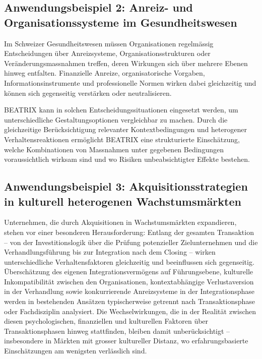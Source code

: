 \documentclass[11pt,a4paper]{article}
\begin{document}
\subsection{Anwendungsbeispiel 2: Anreiz- und Organisationssysteme im Gesundheitswesen}

Im Schweizer Gesundheitswesen müssen Organisationen regelmässig Entscheidungen über Anreizsysteme, Organisationsstrukturen oder Veränderungsmassnahmen treffen, deren Wirkungen sich über mehrere Ebenen hinweg entfalten. Finanzielle Anreize, organisatorische Vorgaben, Informationsinstrumente und professionelle Normen wirken dabei gleichzeitig und können sich gegenseitig verstärken oder neutralisieren.

BEATRIX kann in solchen Entscheidungssituationen eingesetzt werden, um unterschiedliche Gestaltungsoptionen vergleichbar zu machen. Durch die gleichzeitige Berücksichtigung relevanter Kontextbedingungen und heterogener Verhaltensreaktionen ermöglicht BEATRIX eine strukturierte Einschätzung, welche Kombinationen von Massnahmen unter gegebenen Bedingungen voraussichtlich wirksam sind und wo Risiken unbeabsichtigter Effekte bestehen.

\subsection{Anwendungsbeispiel 3: Akquisitionsstrategien in kulturell heterogenen Wachstumsmärkten}

Unternehmen, die durch Akquisitionen in Wachstumsmärkten expandieren, stehen vor einer besonderen Herausforderung: Entlang der gesamten Transaktion -- von der Investitionslogik über die Prüfung potenzieller Zielunternehmen und die Verhandlungsführung bis zur Integration nach dem Closing -- wirken unterschiedliche Verhaltensfaktoren gleichzeitig und beeinflussen sich gegenseitig. Überschätzung des eigenen Integrationsvermögens auf Führungsebene, kulturelle Inkompatibilität zwischen den Organisationen, kontextabhängige Verlustaversion in der Verhandlung sowie konkurrierende Anreizsysteme in der Integrationsphase werden in bestehenden Ansätzen typischerweise getrennt nach Transaktionsphase oder Fachdisziplin analysiert. Die Wechselwirkungen, die in der Realität zwischen diesen psychologischen, finanziellen und kulturellen Faktoren über Transaktionsphasen hinweg stattfinden, bleiben damit unberücksichtigt -- insbesondere in Märkten mit grosser kultureller Distanz, wo erfahrungsbasierte Einschätzungen am wenigsten verlässlich sind.
\end{document}
